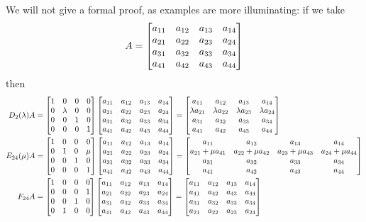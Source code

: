 \documentclass[reqno]{amsart}
\theoremstyle{definition}
\begin{document}
We will not give a formal proof, as examples are more illuminating:
if we take
\[ A = \left[\begin{matrix}
        a_{11} & a_{12} & a_{13} & a_{14} \\
        a_{21} & a_{22} & a_{23} & a_{24} \\
        a_{31} & a_{32} & a_{33} & a_{34} \\
        a_{41} & a_{42} & a_{43} & a_{44}
       \end{matrix}\right]
\]
then
\begin{align*}
 D_2(\lambda)A &=
    \left[\begin{matrix}
     1 & 0 & 0 & 0 \\
     0 & \lambda & 0 & 0 \\
     0 & 0 & 1 & 0 \\
     0 & 0 & 0 & 1
    \end{matrix}\right]
    \left[\begin{matrix}
     a_{11} & a_{12} & a_{13} & a_{14} \\
     a_{21} & a_{22} & a_{23} & a_{24} \\
     a_{31} & a_{32} & a_{33} & a_{34} \\
     a_{41} & a_{42} & a_{43} & a_{44}
    \end{matrix}\right]
    =
    \left[\begin{matrix}
     a_{11} & a_{12} & a_{13} & a_{14} \\
     \lambda a_{21} & \lambda a_{22} & \lambda a_{23} & \lambda a_{24} \\
     a_{31} & a_{32} & a_{33} & a_{34} \\
     a_{41} & a_{42} & a_{43} & a_{44}
    \end{matrix}\right] \\
 E_{24}(\mu)A &=
    \left[\begin{matrix}
     1 & 0 & 0 & 0 \\
     0 & 1 & 0 & \mu \\
     0 & 0 & 1 & 0 \\
     0 & 0 & 0 & 1
    \end{matrix}\right]
    \left[\begin{matrix}
     a_{11} & a_{12} & a_{13} & a_{14} \\
     a_{21} & a_{22} & a_{23} & a_{24} \\
     a_{31} & a_{32} & a_{33} & a_{34} \\
     a_{41} & a_{42} & a_{43} & a_{44}
    \end{matrix}\right]
    =
    \left[\begin{matrix}
     a_{11} & a_{12} & a_{13} & a_{14} \\
     a_{21}+\mu a_{41} & a_{22}+\mu a_{42} & a_{23}+\mu a_{43} & a_{24}+\mu a_{44} \\
     a_{31} & a_{32} & a_{33} & a_{34} \\
     a_{41} & a_{42} & a_{43} & a_{44}
    \end{matrix}\right] \\
 F_{24}A &=
    \left[\begin{matrix}
     1 & 0 & 0 & 0 \\
     0 & 0 & 0 & 1 \\
     0 & 0 & 1 & 0 \\
     0 & 1 & 0 & 0
    \end{matrix}\right]
    \left[\begin{matrix}
     a_{11} & a_{12} & a_{13} & a_{14} \\
     a_{21} & a_{22} & a_{23} & a_{24} \\
     a_{31} & a_{32} & a_{33} & a_{34} \\
     a_{41} & a_{42} & a_{43} & a_{44}
    \end{matrix}\right]
    =
    \left[\begin{matrix}
     a_{11} & a_{12} & a_{13} & a_{14} \\
     a_{41} & a_{42} & a_{43} & a_{44} \\
     a_{31} & a_{32} & a_{33} & a_{34} \\
     a_{21} & a_{22} & a_{23} & a_{24}
    \end{matrix}\right]
\end{align*}
\end{document}
